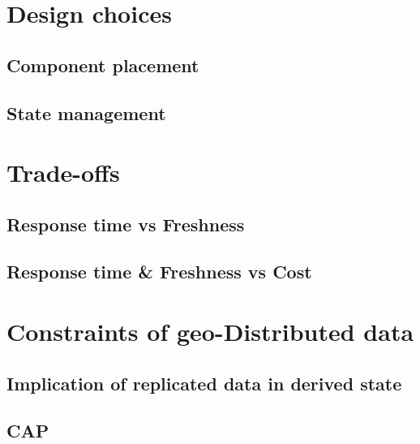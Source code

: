 \section{Design choices}
\subsection{Component placement}
\subsection{State management}


\section{Trade-offs}
\subsection{Response time vs Freshness}
\subsection{Response time \& Freshness vs Cost}


\section{Constraints of geo-Distributed data}
\subsection{Implication of replicated data in derived state}
\subsection{CAP}